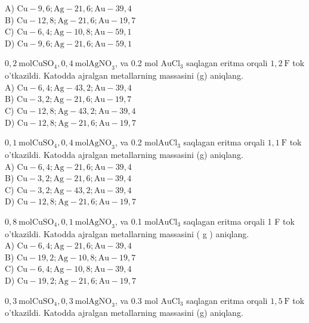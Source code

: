 A) $\mathrm{Cu}-9,6 ; \mathrm{Ag}-21,6 ; \mathrm{Au}-39,4$\\
B) $\mathrm{Cu}-12,8 ; \mathrm{Ag}-21,6 ; \mathrm{Au}-19,7$\\
C) $\mathrm{Cu}-6,4 ; \mathrm{Ag}-10,8 ; \mathrm{Au}-59,1$\\
D) $\mathrm{Cu}-9,6 ; \mathrm{Ag}-21,6 ; \mathrm{Au}-59,1$
  \item $0,2 \mathrm{~mol} \mathrm{CuSO}_{4}, 0,4 \mathrm{~mol} \mathrm{AgNO}_{3}$, va 0.2 mol $\mathrm{AuCl}_{3}$ saqlagan eritma orqali $1,2 \mathrm{~F}$ tok o'tkazildi. Katodda ajralgan metallarning massasini (g) aniqlang.\\
A) $\mathrm{Cu}-6,4 ; \mathrm{Ag}-43,2 ; \mathrm{Au}-39,4$\\
B) $\mathrm{Cu}-3,2 ; \mathrm{Ag}-21,6 ; \mathrm{Au}-19,7$\\
C) $\mathrm{Cu}-12,8 ; \mathrm{Ag}-43,2 ; \mathrm{Au}-39,4$\\
D) $\mathrm{Cu}-12,8 ; \mathrm{Ag}-21,6 ; \mathrm{Au}-19,7$
  \item $0,1 \mathrm{~mol} \mathrm{CuSO}_{4}, 0,4 \mathrm{~mol} \mathrm{AgNO}_{3}$, va 0.2 $\mathrm{mol} \mathrm{AuCl}_{3}$ saqlagan eritma orqali $1,1 \mathrm{~F}$ tok o'tkazildi. Katodda ajralgan metallarning massasini (g) aniqlang.\\
A) $\mathrm{Cu}-6,4 ; \mathrm{Ag}-21,6 ; \mathrm{Au}-39,4$\\
B) $\mathrm{Cu}-3,2 ; \mathrm{Ag}-21,6 ; \mathrm{Au}-39,4$\\
C) $\mathrm{Cu}-3,2 ; \mathrm{Ag}-43,2 ; \mathrm{Au}-39,4$\\
D) $\mathrm{Cu}-12,8 ; \mathrm{Ag}-21,6 ; \mathrm{Au}-19,7$
  \item $0,8 \mathrm{~mol} \mathrm{CuSO}_{4}, 0,1 \mathrm{~mol} \mathrm{AgNO}_{3}$, va 0.1 $\mathrm{mol} \mathrm{AuCl}_{3}$ saqlagan eritma orqali 1 F tok o'tkazildi. Katodda ajralgan metallarning massasini ( g ) aniqlang.\\
A) $\mathrm{Cu}-6,4 ; \mathrm{Ag}-21,6 ; \mathrm{Au}-39,4$\\
B) $\mathrm{Cu}-19,2 ; \mathrm{Ag}-10,8 ; \mathrm{Au}-19,7$\\
C) $\mathrm{Cu}-6,4 ; \mathrm{Ag}-10,8 ; \mathrm{Au}-39,4$\\
D) $\mathrm{Cu}-19,2 ; \mathrm{Ag}-21,6 ; \mathrm{Au}-19,7$
  \item $0,3 \mathrm{~mol} \mathrm{CuSO}_{4}, 0,3 \mathrm{~mol} \mathrm{AgNO}_{3}$, va 0.3 mol $\mathrm{AuCl}_{3}$ saqlagan eritma orqali $1,5 \mathrm{~F}$ tok o'tkazildi. Katodda ajralgan metallarning massasini (g) aniqlang.\\
